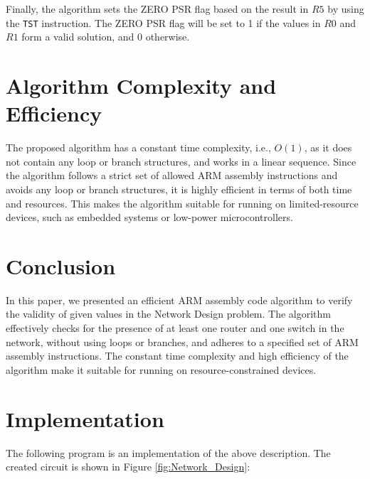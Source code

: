 Finally, the algorithm sets the ZERO PSR flag based on the result in $R5$ by using the \texttt{TST} instruction. The ZERO PSR flag will be set to 1 if the values in $R0$ and $R1$ form a valid solution, and 0 otherwise.

\section{Algorithm Complexity and Efficiency}
The proposed algorithm has a constant time complexity, i.e., $O(1)$, as it does not contain any loop or branch structures, and works in a linear sequence. Since the algorithm follows a strict set of allowed ARM assembly instructions and avoids any loop or branch structures, it is highly efficient in terms of both time and resources. This makes the algorithm suitable for running on limited-resource devices, such as embedded systems or low-power microcontrollers.

\section{Conclusion}
In this paper, we presented an efficient ARM assembly code algorithm to verify the validity of given values in the Network Design problem. The algorithm effectively checks for the presence of at least one router and one switch in the network, without using loops or branches, and adheres to a specified set of ARM assembly instructions. The constant time complexity and high efficiency of the algorithm make it suitable for running on resource-constrained devices.



\section{Implementation}

The following program is an implementation of the above description. The created circuit is shown in Figure \ref{fig:Network_Design}:

